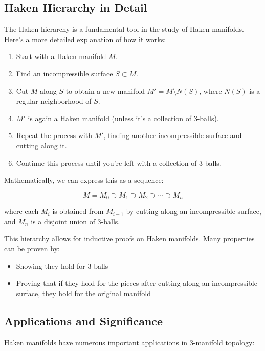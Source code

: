 \documentclass{article}
\begin{document}
\subsection{Haken Hierarchy in Detail}

The Haken hierarchy is a fundamental tool in the study of Haken manifolds. Here's a more detailed explanation of how it works:

\begin{enumerate}
  \item Start with a Haken manifold $M$.
  \item Find an incompressible surface $S \subset M$.
  \item Cut $M$ along $S$ to obtain a new manifold $M' = M \setminus N(S)$, where $N(S)$ is a regular neighborhood of $S$.
  \item $M'$ is again a Haken manifold (unless it's a collection of 3-balls).
  \item Repeat the process with $M'$, finding another incompressible surface and cutting along it.
  \item Continue this process until you're left with a collection of 3-balls.
\end{enumerate}

Mathematically, we can express this as a sequence:

\[ M = M_0 \supset M_1 \supset M_2 \supset \cdots \supset M_n \]

where each $M_i$ is obtained from $M_{i-1}$ by cutting along an incompressible surface, and $M_n$ is a disjoint union of 3-balls.

This hierarchy allows for inductive proofs on Haken manifolds. Many properties can be proven by:
\begin{itemize}
  \item Showing they hold for 3-balls
  \item Proving that if they hold for the pieces after cutting along an incompressible surface, they hold for the original manifold
\end{itemize}

\subsection{Applications and Significance}

Haken manifolds have numerous important applications in 3-manifold topology:
\end{document}
